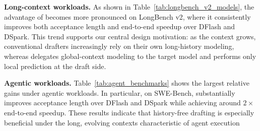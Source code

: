 \textbf{Long-context workloads.} 
As shown in Table~\ref{tab:longbench_v2_models}, the advantage of \we becomes more pronounced on LongBench v2, where it consistently improves both acceptance length and end-to-end speedup over DFlash and DSpark. This trend supports our central design motivation: as the context grows, conventional drafters increasingly rely on their own long-history modeling, whereas \we delegates global-context modeling to the target model and performs only local prediction at the draft side.

\textbf{Agentic workloads.} 
Table~\ref{tab:agent_benchmarks} shows the largest relative gains under agentic workloads. In particular, on SWE-Bench, \we substantially improves acceptance length over DFlash and DSpark while achieving around \(2\times\) end-to-end speedup. These results indicate that history-free drafting is especially beneficial under the long, evolving contexts characteristic of agent execution


